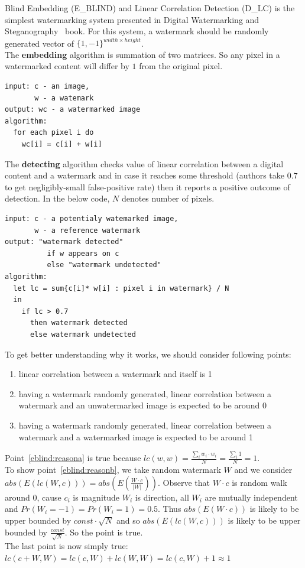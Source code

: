 \documentclass[a4paper,12pt]{article}
\begin{document}
Blind Embedding (E\_BLIND) and Linear Correlation Detection (D\_LC) is the simplest watermarking
system presented in Digital Watermarking and Steganography~\cite{dwas} book.
For this system, a watermark should be randomly generated vector of $\{1, -1\}^{width\times height}$.\\
The \textbf{embedding} algorithm is summation of two matrices. So any pixel in
a watermarked content will differ by $1$ from the original pixel.
\begin{lstlisting}
input: c - an image,
       w - a watemark
output: wc - a watermarked image
algorithm:
  for each pixel i do
    wc[i] = c[i] + w[i]
\end{lstlisting}
The \textbf{detecting} algorithm checks value of linear correlation between
a digital content and a watermark and in case it reaches some threshold
(authors take $0.7$ to get negligibly-small false-positive rate) then it reports
a positive outcome of detection.
In the below code, $N$ denotes number of pixels.
\begin{lstlisting}
input: c - a potentialy watemarked image,
       w - a reference watermark
output: "watermark detected"
          if w appears on c
          else "watermark undetected"
algorithm:
  let lc = sum{c[i]* w[i] : pixel i in watermark} / N
  in
    if lc > 0.7
      then watermark detected
      else watermark undetected
\end{lstlisting}
To get better understanding why it works, we should consider following points:
\begin{enumerate}
\item \label{eblind:reasona} linear correlation between a watermark and itself
      is 1
\item \label{eblind:reasonb} having a watermark randomly generated, linear
      correlation between a watermark and an unwatermarked image is expected to
      be around 0
\item \label{eblind:reasonc} having a watermark randomly generated, linear
      correlation between a watermark and a watermarked image is expected to be
      around 1
\end{enumerate}
Point~\ref{eblind:reasona} is true because
    $lc(w, w) = \frac{\sum_i w_i\cdot w_i}{N} = \frac{\sum_i 1}{N} = 1$.\\
To show point~\ref{eblind:reasonb}, we take random watermark $W$ and we consider
    $abs(E(lc(W, c))) = abs(E(\frac{W\cdot c}{|W|}))$. Observe that $W\cdot c$ is random walk
    around $0$, cause $c_i$ is magnitude $W_i$ is direction, all $W_i$ are
    mutually independent and $Pr(W_i = -1) = Pr(W_i = 1) = 0.5$. Thus
    $abs(E(W\cdot c))$ is likely to be upper bounded by $const\cdot \sqrt{N}$
    and so $abs(E(lc(W, c)))$ is likely to be upper bounded by
    $\frac{const}{\sqrt{N}}$. So the point is true.\\
The last point is now simply true:\\
    $lc(c+W, W) = lc(c, W) + lc(W, W) = lc(c, W)  + 1 \approx 1$
\end{document}
